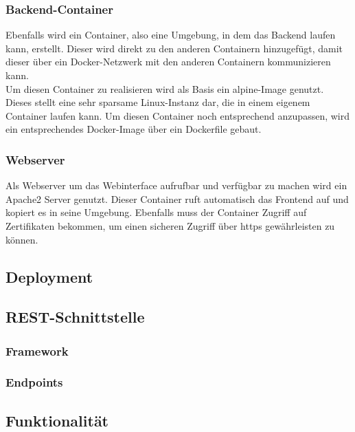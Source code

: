 		\subsubsection{Backend-Container}
		
		Ebenfalls wird ein Container, also eine Umgebung, in dem das Backend laufen kann, erstellt. Dieser wird direkt zu den anderen Containern hinzugefügt, damit dieser über ein Docker-Netzwerk mit den anderen Containern kommunizieren kann.~\\
		Um diesen Container zu realisieren wird als Basis ein alpine-Image genutzt. Dieses stellt eine sehr sparsame Linux-Instanz dar, die in einem eigenem Container laufen kann. Um diesen Container noch entsprechend anzupassen, wird ein entsprechendes Docker-Image über ein Dockerfile gebaut.\cite{alpine}
		
		\subsubsection{Webserver}
		
		Als Webserver um das Webinterface aufrufbar und verfügbar zu machen wird ein Apache2 Server genutzt. Dieser Container ruft automatisch das Frontend auf und kopiert es in seine Umgebung. Ebenfalls muss der Container Zugriff auf Zertifikaten bekommen, um einen sicheren Zugriff über \gls{https} gewährleisten zu können.\cite{apache}
				
	\subsection{Deployment}
	\subsection{REST-Schnittstelle}
		\subsubsection{Framework}
		\subsubsection{Endpoints}
	\subsection{Funktionalität}
